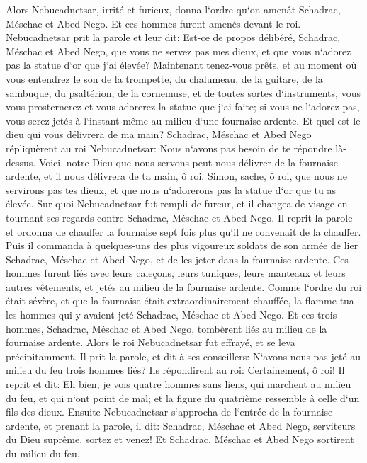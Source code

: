 \verse Alors Nebucadnetsar, irrité et furieux, donna l`ordre qu`on amenât Schadrac, Méschac et Abed Nego. Et ces hommes furent amenés devant le roi. 
\verse Nebucadnetsar prit la parole et leur dit: Est-ce de propos délibéré, Schadrac, Méschac et Abed Nego, que vous ne servez pas mes dieux, et que vous n`adorez pas la statue d`or que j`ai élevée? 
\verse Maintenant tenez-vous prêts, et au moment où vous entendrez le son de la trompette, du chalumeau, de la guitare, de la sambuque, du psaltérion, de la cornemuse, et de toutes sortes d`instruments, vous vous prosternerez et vous adorerez la statue que j`ai faite; si vous ne l`adorez pas, vous serez jetés à l`instant même au milieu d`une fournaise ardente. Et quel est le dieu qui vous délivrera de ma main? 
\verse Schadrac, Méschac et Abed Nego répliquèrent au roi Nebucadnetsar: Nous n`avons pas besoin de te répondre là-dessus. 
\verse Voici, notre Dieu que nous servons peut nous délivrer de la fournaise ardente, et il nous délivrera de ta main, ô roi. 
\verse Simon, sache, ô roi, que nous ne servirons pas tes dieux, et que nous n`adorerons pas la statue d`or que tu as élevée. 
\verse Sur quoi Nebucadnetsar fut rempli de fureur, et il changea de visage en tournant ses regards contre Schadrac, Méschac et Abed Nego. Il reprit la parole et ordonna de chauffer la fournaise sept fois plus qu`il ne convenait de la chauffer. 
\verse Puis il commanda à quelques-uns des plus vigoureux soldats de son armée de lier Schadrac, Méschac et Abed Nego, et de les jeter dans la fournaise ardente. 
\verse Ces hommes furent liés avec leurs caleçons, leurs tuniques, leurs manteaux et leurs autres vêtements, et jetés au milieu de la fournaise ardente. 
\verse Comme l`ordre du roi était sévère, et que la fournaise était extraordinairement chauffée, la flamme tua les hommes qui y avaient jeté Schadrac, Méschac et Abed Nego. 
\verse Et ces trois hommes, Schadrac, Méschac et Abed Nego, tombèrent liés au milieu de la fournaise ardente. 
\verse Alors le roi Nebucadnetsar fut effrayé, et se leva précipitamment. Il prit la parole, et dit à ses conseillers: N`avons-nous pas jeté au milieu du feu trois hommes liés? Ils répondirent au roi: Certainement, ô roi! 
\verse Il reprit et dit: Eh bien, je vois quatre hommes sans liens, qui marchent au milieu du feu, et qui n`ont point de mal; et la figure du quatrième ressemble à celle d`un fils des dieux. 
\verse Ensuite Nebucadnetsar s`approcha de l`entrée de la fournaise ardente, et prenant la parole, il dit: Schadrac, Méschac et Abed Nego, serviteurs du Dieu suprême, sortez et venez! Et Schadrac, Méschac et Abed Nego sortirent du milieu du feu. 
